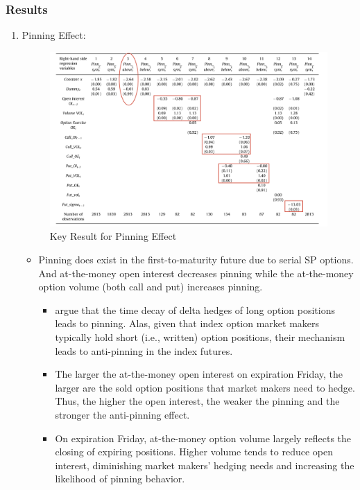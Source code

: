 \documentclass[10pt]{report}
\begin{document}
\subsubsection{Results}

\begin{enumerate}
    \item Pinning Effect:
    \begin{figure}[!h]
        \centering
        \includegraphics[width=1\linewidth]{p1.png}
        \caption{Key Result for Pinning Effect}
        \label{p1}
    \end{figure}
    \begin{itemize}
        \item Pinning does exist in the first-to-maturity future due to serial SP options. And at-the-money open interest decreases pinning while the at-the-money option volume (both call and put) increases pinning.
        \begin{itemize}
            \item \citet{Avellaneda2003AMM} argue that the time decay of delta hedges of long option positions leads to pinning. Alas, given that index option market makers typically hold short (i.e., written) option positions, their mechanism leads to anti-pinning in the index futures.
            \item The larger the at-the-money open interest on expiration Friday, the larger are the sold option positions that market makers need to hedge. Thus, the higher the open interest, the weaker the pinning and the stronger the anti-pinning effect.
            \item On expiration Friday, at-the-money option volume largely reflects the closing of expiring positions. Higher volume tends to reduce open interest, diminishing market makers’ hedging needs and increasing the likelihood of pinning behavior.

\end{itemize}
\end{itemize}
\end{enumerate}
\end{document}
